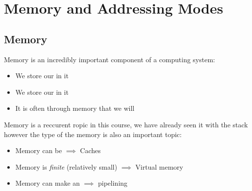 \section{Memory and Addressing Modes}
\subsection{Memory}
Memory is an incredibly important component of a computing system:
\begin{itemize}
    \item We store our  in it 
    \item We store our  in it 
	\item It is often through memory that we will 
\end{itemize}
	Memory is a reccurent ropic in this course, we have already seen it with the stack however the type of the memory is also an important topic:
	\begin{itemize}
		\item Memory can be  $\implies $ Caches 
		\item Memory is \textit{finite} (relatively small) $\implies $ Virtual memory 
		\item Memory can make an  $\implies $ pipelining
	\end{itemize}
